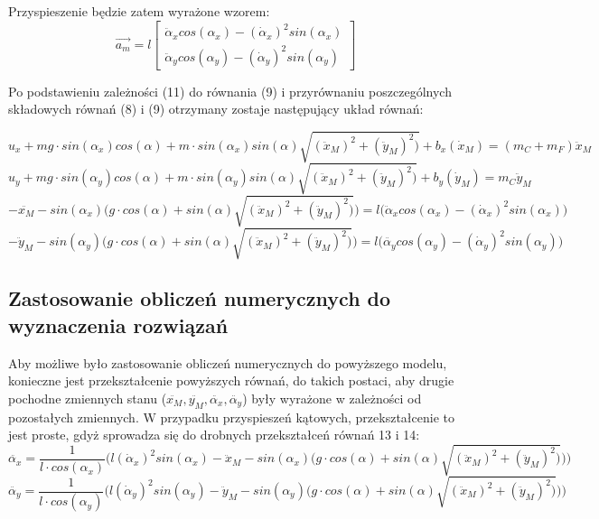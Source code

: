 \documentclass[10pt]{article}
\begin{document}
Przyspieszenie będzie zatem wyrażone wzorem:
\begin{equation}
\vec{a_m} = l
\begin{bmatrix}
\ddot{\alpha}_x cos(\alpha_x) - (\dot{\alpha}_x)^2 sin(\alpha_x) \\
\ddot{\alpha}_y cos(\alpha_y) - (\dot{\alpha}_y)^2 sin(\alpha_y)
\end{bmatrix}
\end{equation}

Po podstawieniu zależności (11) do równania (9) i przyrównaniu poszczególnych składowych równań (8) i (9) otrzymany zostaje następujący układ równań:

\begin{equation}
u_x + mg \cdot sin(\alpha_x) cos(\alpha) + m \cdot sin(\alpha_x) sin(\alpha) \sqrt{(\ddot{x}_M)^2 + (\ddot{y}_M)^2)} + b_x(\dot{x}_M) = (m_C + m_F) \ddot{x}_M
\end{equation}
\begin{equation}
u_y + mg \cdot sin(\alpha_y) cos(\alpha) + m \cdot sin(\alpha_y) sin(\alpha) \sqrt{(\ddot{x}_M)^2 + (\ddot{y}_M)^2)} + b_y(\dot{y}_M) = m_C \ddot{y}_M
\end{equation}
\begin{equation}
-\ddot{x_M}-sin(\alpha_x) \Big( g \cdot cos(\alpha) + sin(\alpha)\sqrt{(\ddot{x}_M)^2 + (\ddot{y}_M)^2)} \Big) = l \big( \ddot{\alpha}_x cos(\alpha_x) - (\dot{\alpha}_x)^2 sin(\alpha_x) \big)
\end{equation}
\begin{equation}
-\ddot{y}_M-sin(\alpha_y) \Big( g \cdot cos(\alpha) + sin(\alpha)\sqrt{(\ddot{x}_M)^2 + (\ddot{y}_M)^2)} \Big) = l \big( \ddot{\alpha_y} cos(\alpha_y) - (\dot{\alpha}_y)^2 sin(\alpha_y) \big)
\end{equation}

\newpage
\subsection*{Zastosowanie obliczeń numerycznych do wyznaczenia rozwiązań}
Aby możliwe było zastosowanie obliczeń numerycznych do powyższego modelu, konieczne jest przekształcenie powyższych równań, do takich postaci, aby drugie pochodne zmiennych stanu ($\ddot{x_M}, \ddot{y_M}, \ddot{\alpha_x}, \ddot{\alpha_y}$) były wyrażone w zależności od pozostałych zmiennych. W przypadku przyspieszeń kątowych, przekształcenie to jest proste, gdyż sprowadza się do drobnych przekształceń równań 13 i 14:
\begin{equation}
\ddot{\alpha_x} = \frac{1}{l \cdot cos(\alpha_x)} \bigg(l (\dot{\alpha}_x)^2 sin(\alpha_x) - \ddot{x}_M-sin(\alpha_x) \Big( g \cdot cos(\alpha) + sin(\alpha)\sqrt{(\ddot{x}_M)^2 + (\ddot{y}_M)^2)} \Big) \bigg)
\end{equation}
\begin{equation}
\ddot{\alpha_y} = \frac{1}{l \cdot cos(\alpha_y)} \bigg(l (\dot{\alpha}_y)^2 sin(\alpha_y) - \ddot{y}_M-sin(\alpha_y) \Big( g \cdot cos(\alpha) + sin(\alpha)\sqrt{(\ddot{x}_M)^2 + (\ddot{y}_M)^2)} \Big) \bigg)
\end{equation}
\end{document}
